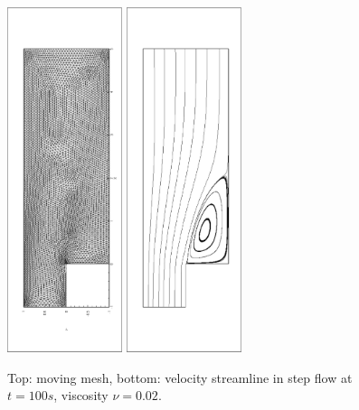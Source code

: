 \documentclass{eajam}
\begin{document}
      \begin{figure}[!htbp]
        \centering
        \includegraphics[width = 0.3\textwidth, angle =
        -90]{picture/L_shaped_flow_data/mesh.eps}
        \includegraphics[width = 0.3\textwidth, angle =
        -90]{picture/L_shaped_flow_data/streamline.eps}
        \caption{\small Top: moving mesh, bottom: velocity streamline
          in step flow at $t = 100s$, viscosity $\nu = 0.02$.}
        \label{fig::step_flow_mesh_streamline}
      \end{figure}
\end{document}
